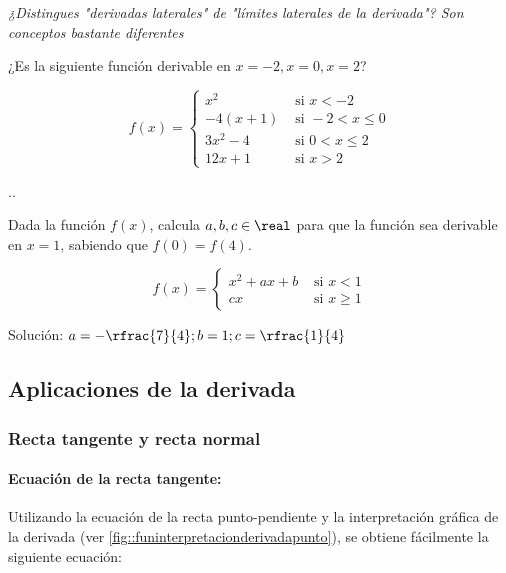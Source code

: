 \textit{¿Distingues "derivadas laterales" de "límites laterales de la derivada"? Son conceptos bastante diferentes}

\begin{problem}
¿Es la siguiente función derivable en $x=-2,x=0,x=2$?

\[f(x) = \begin{cases}
x^2 & \text{ si } x<-2\\
-4(x+1) & \text{ si } -2<x\leq0\\
3x^2-4 & \text{ si } 0<x\leq2\\
12x+1 & \text{ si } x>2
\end{cases}\]
\solution

.\vspace{10cm}.

\end{problem}

\begin{problem}
Dada la función $f(x)$, calcula $a,b,c\in\real$ para que la función sea derivable en $x=1$, sabiendo que $f(0) = f(4)$.

\[
f(x) = 
\begin{cases}
	x^2+ax+b&\text{ si } x<1\\
	cx & \text{ si } x\geq 1
\end{cases}
\]
\solution

Solución: $a=-\rfrac{7}{4}; b=1; c=\rfrac{1}{4}$


\end{problem}



\subsection{Aplicaciones de la derivada}

\subsubsection{Recta tangente y recta normal}

\paragraph{Ecuación de la recta tangente:} Utilizando la ecuación de la recta punto-pendiente y la interpretación gráfica de la derivada (ver \ref{fig::funinterpretacionderivadapunto}), se obtiene fácilmente la siguiente ecuación:

